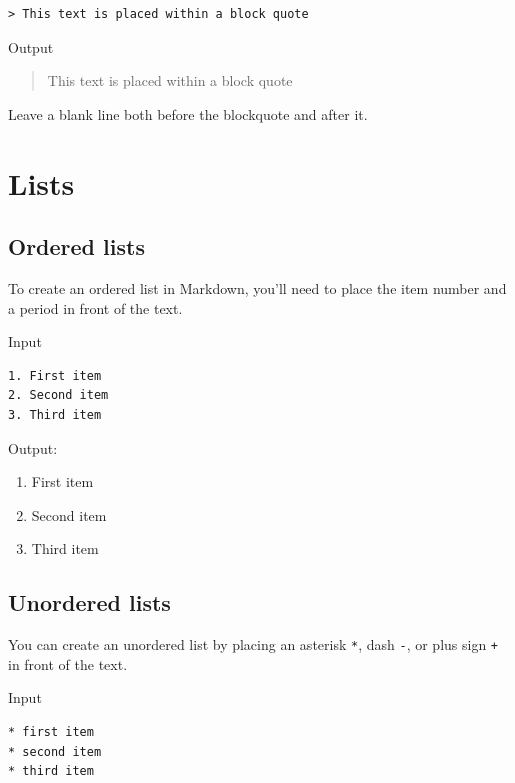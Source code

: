\documentclass[
]{book}
\providecommand{\tightlist}{%
  \setlength{\itemsep}{0pt}\setlength{\parskip}{0pt}}
\begin{document}
\begin{verbatim}
> This text is placed within a block quote
\end{verbatim}

Output

\begin{quote}
This text is placed within a block quote
\end{quote}

Leave a blank line both before the blockquote and after it.

\hypertarget{lists}{%
\section{Lists}\label{lists}}

\hypertarget{ordered-lists}{%
\subsection*{Ordered lists}\label{ordered-lists}}

To create an ordered list in Markdown, you'll need to place the item number and a period in front of the text.

Input

\begin{verbatim}
1. First item
2. Second item
3. Third item 
\end{verbatim}

Output:

\begin{enumerate}
\def\labelenumi{\arabic{enumi}.}
\tightlist
\item
  First item
\item
  Second item
\item
  Third item
\end{enumerate}

\hypertarget{unordered-lists}{%
\subsection*{Unordered lists}\label{unordered-lists}}

You can create an unordered list by placing an asterisk \texttt{*}, dash \texttt{-}, or plus sign \texttt{+} in front of the text.

Input

\begin{verbatim}
* first item
* second item
* third item 
\end{verbatim}
\end{document}
